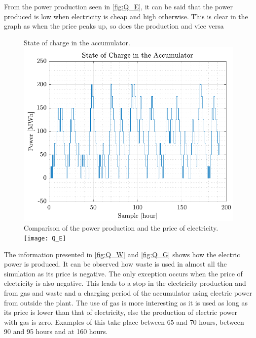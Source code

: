 From the power production seen in \autoref{fig:Q_E}, it can be said that the power produced is low when electricity is cheap and high otherwise. This is clear in the graph as when the price peaks up, so does the production and vice versa
\begin{figure}[H]
    \captionbox 
    {
    	State of charge in the accumulator.
        \label{fig:E_A}                                  
    }                                                                 
    {                                                                 
        \includegraphics[height=.37\textwidth]{figures/E_A}
    }                                                                    
    \hspace{5pt}                                                          
    \captionbox  
    {        
        Comparison of the power production and the price of electricity.    
        \label{fig:Q_E}                                    
    }                                                                     
    {   
        \texttt{[image: Q\_E]}            
    }                                                                             
\end{figure}
The information presented in \autoref{fig:Q_W} and \ref{fig:Q_G} shows how the electric power is produced. It can be observed how waste is used in almost all the simulation as its price is negative. The only exception occurs when the price of electricity is also negative. This leads to a stop in the electricity production and from gas and waste and a charging period of the accumulator using electric power from outside the plant. The use of gas is more interesting as it is used as long as its price is lower than that of electricity, else the production of electric power with gas is zero. Examples of this take place between 65 and 70 hours, between 90 and 95 hours and at 160 hours.
